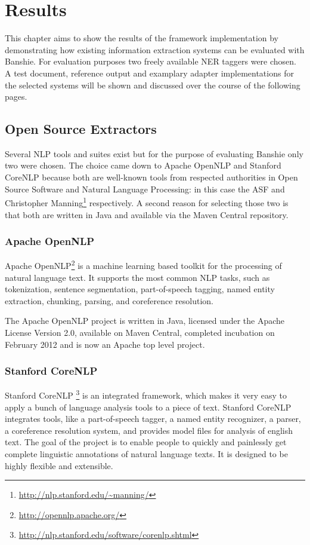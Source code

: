 \section{Results}
\label{sec:results}
This chapter aims to show the results of the framework implementation by demonstrating how existing information extraction systems can be evaluated with Banshie. For evaluation purposes two freely available \gls{NER} taggers were chosen. A test document, reference output and examplary adapter implementations for the selected systems will be shown and discussed over the course of the following pages.

\subsection{Open Source Extractors}
Several \gls{NLP} tools and suites exist but for the purpose of evaluating Banshie only two were chosen. The choice came down to Apache OpenNLP and Stanford CoreNLP because both are well-known tools from respected authorities in Open Source Software and Natural Language Processing: in this case the \acs{ASF} and Christopher Manning\footnote{\url{http://nlp.stanford.edu/~manning/}} respectively. A second reason for selecting those two is that both are written in Java and available via the Maven Central repository.

\subsubsection{Apache OpenNLP}
Apache OpenNLP\footnote{\url{http://opennlp.apache.org/}} is a machine learning based toolkit for the processing of natural language text. It supports the most common NLP tasks, such as tokenization, sentence segmentation, part-of-speech tagging, named entity extraction, chunking, parsing, and coreference resolution. \cite{OpenNLP}

The Apache OpenNLP project is written in Java, licensed under the Apache License Version 2.0, available on Maven Central, completed incubation on February 2012 and is now an Apache top level project.

\subsubsection{Stanford CoreNLP}
Stanford CoreNLP
\footnote{\url{http://nlp.stanford.edu/software/corenlp.shtml}} is an integrated framework, which makes it very easy to apply a bunch of language analysis tools to a piece of text. Stanford CoreNLP integrates tools, like a part-of-speech tagger, a named entity recognizer, a parser, a coreference resolution system, and provides model files for analysis of english text. The goal of the project is to enable people to quickly and painlessly get complete linguistic annotations of natural language texts. It is designed to be highly flexible and extensible. \cite{CoreNLP}

